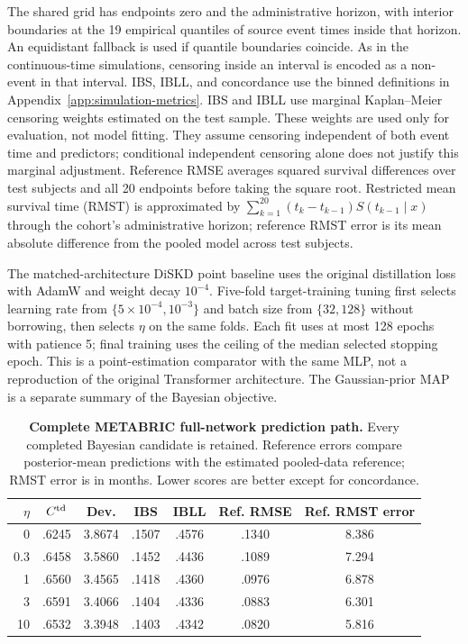 \documentclass{article} %
\begin{document}
The shared grid has endpoints zero and the administrative horizon, with interior boundaries at the 19 empirical quantiles of source event times inside that horizon. An equidistant fallback is used if quantile boundaries coincide. As in the continuous-time simulations, censoring inside an interval is encoded as a non-event in that interval. IBS, IBLL, and concordance use the binned definitions in Appendix~\ref{app:simulation-metrics}. IBS and IBLL use marginal Kaplan--Meier censoring weights estimated on the test sample. These weights are used only for evaluation, not model fitting. They assume censoring independent of both event time and predictors; conditional independent censoring alone does not justify this marginal adjustment. Reference RMSE averages squared survival differences over test subjects and all 20 endpoints before taking the square root. Restricted mean survival time (RMST) is approximated by $\sum_{k=1}^{20}(t_k-t_{k-1})S(t_{k-1}\mid x)$ through the cohort's administrative horizon; reference RMST error is its mean absolute difference from the pooled model across test subjects.

The matched-architecture DiSKD point baseline uses the original distillation loss with AdamW and weight decay $10^{-4}$. Five-fold target-training tuning first selects learning rate from $\{5\times10^{-4},10^{-3}\}$ and batch size from $\{32,128\}$ without borrowing, then selects $\eta$ on the same folds. Each fit uses at most 128 epochs with patience 5; final training uses the ceiling of the median selected stopping epoch. This is a point-estimation comparator with the same MLP, not a reproduction of the original Transformer architecture. The Gaussian-prior MAP is a separate summary of the Bayesian objective.

\begin{table}[htbp]
\centering\footnotesize
\caption{\textbf{Complete METABRIC full-network prediction path.} Every completed Bayesian candidate is retained. Reference errors compare posterior-mean predictions with the estimated pooled-data reference; RMST error is in months. Lower scores are better except for concordance.}
\label{tab:real-metabric-path}
\setlength{\tabcolsep}{6pt}
\begin{tabular}{@{}rcccccc@{}}
\toprule
$\eta$ & $C^{\rm td}$ & Dev. & IBS & IBLL & Ref. RMSE & Ref. RMST error\\
\midrule
0 & .6245 & 3.8674 & .1507 & .4576 & .1340 & 8.386\\
0.3 & .6458 & 3.5860 & .1452 & .4436 & .1089 & 7.294\\
1 & .6560 & 3.4565 & .1418 & .4360 & .0976 & 6.878\\
3 & .6591 & 3.4066 & .1404 & .4336 & .0883 & 6.301\\
10 & .6532 & 3.3948 & .1403 & .4342 & .0820 & 5.816\\
\bottomrule
\end{tabular}
\end{table}
\end{document}
